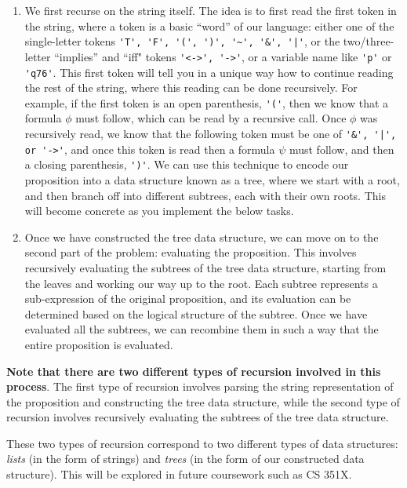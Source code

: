\documentclass{article}
\begin{document}
    \begin{enumerate}[label = \arabic*.]
        \item We first recurse on the string itself. The idea is to first read the first token in the string, where a token is a basic “word” of our language: either one of the single-letter tokens \lstinline{'T', 'F', '(', ')', '~', '&', '|'}, or the two/three-letter “implies” and ``iff" tokens \lstinline{'<->', '->'}, or a variable name like \lstinline{'p'} or \lstinline{'q76'}. This first token will tell you in a unique way how to continue reading the rest of the string, where this reading can be done recursively. For example, if the first token is an open parenthesis, \lstinline{'('}, then we know that a formula $\phi$ must follow, which can be read by a recursive call. Once $\phi$ was recursively read, we know that the following token must be one of \lstinline{'&', '|', or '->'}, and once this token is read then a formula $\psi$ must follow, and then a closing parenthesis, \lstinline{')'}. We can use this technique to encode our proposition into a data structure known as a tree, where we start with a root, and then branch off into different subtrees, each with their own roots. This will become concrete as you implement the below tasks.
        \item 
        Once we have constructed the tree data structure, we can move on to the second part of the problem: evaluating the proposition. This involves recursively evaluating the subtrees of the tree data structure, starting from the leaves and working our way up to the root. Each subtree represents a sub-expression of the original proposition, and its evaluation can be determined based on the logical structure of the subtree. Once we have evaluated all the subtrees, we can recombine them in such a way that the entire proposition is evaluated.
    \end{enumerate}
    \textbf{Note that there are two different types of recursion involved in this process}. The first type of recursion involves parsing the string representation of the proposition and constructing the tree data structure, while the second type of recursion involves recursively evaluating the subtrees of the tree data structure.
    
    \vspace{2mm}
    These two types of recursion correspond to two different types of data structures: \textit{lists} (in the form of strings) and \textit{trees} (in the form of our constructed data structure). This will be explored in future coursework such as CS 351X.
\end{document}
